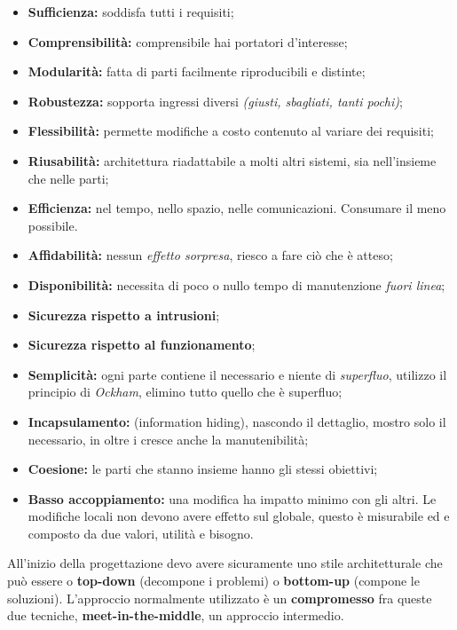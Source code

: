 \begin{itemize}

	\item \textbf{Sufficienza:} soddisfa tutti i requisiti;
	\item \textbf{Comprensibilità:} comprensibile hai portatori d'interesse;
	\item \textbf{Modularità:} fatta di parti facilmente riproducibili e distinte;
	\item \textbf{Robustezza:} sopporta ingressi diversi \textit{(giusti, sbagliati, tanti pochi)};
	\item \textbf{Flessibilità:} permette modifiche a costo contenuto al variare dei requisiti;
	\item \textbf{Riusabilità:} architettura riadattabile a molti altri sistemi, sia nell'insieme che nelle parti;
	\item \textbf{Efficienza:} nel tempo, nello spazio, nelle comunicazioni. Consumare il meno possibile.
	\item \textbf{Affidabilità:} nessun \textit{effetto sorpresa}, riesco a fare ciò che è atteso;
	\item \textbf{Disponibilità:} necessita di poco o nullo tempo di manutenzione \textit{fuori linea};
	\item \textbf{Sicurezza rispetto a intrusioni};
	\item \textbf{Sicurezza rispetto al funzionamento};
	\item \textbf{Semplicità:} ogni parte contiene il necessario e niente di \textit{superfluo}, utilizzo il principio di \textit{Ockham}, elimino tutto quello che è superfluo;
	\item \textbf{Incapsulamento:} (information hiding), nascondo il dettaglio, mostro solo il necessario, in oltre i cresce anche la manutenibilità;
	\item \textbf{Coesione:} le parti che stanno insieme hanno gli stessi obiettivi;
	\item \textbf{Basso accoppiamento:} una modifica ha impatto minimo con gli altri. Le modifiche locali non devono avere effetto sul globale, questo è misurabile ed e composto da due valori, utilità e bisogno.

\end{itemize}

All'inizio della progettazione devo avere sicuramente uno stile architetturale che può essere o \textbf{top-down} (decompone i problemi) o \textbf{bottom-up} (compone le soluzioni). L'approccio normalmente utilizzato è un \textbf{compromesso} fra queste due tecniche, \textbf{meet-in-the-middle}, un approccio intermedio.

